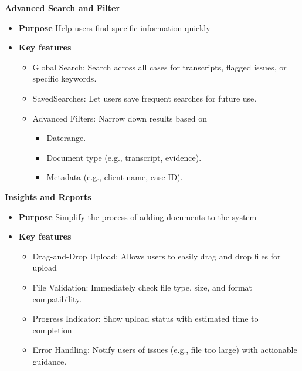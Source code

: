 \documentclass[12pt]{article}
\begin{document}
\textbf{   Advanced Search and Filter}
\begin{itemize}
  \item \textbf{Purpose}  Help users find specific information quickly
  \item \textbf{Key features}   
	\begin{itemize}
		\item  Global Search: Search across all cases for transcripts, flagged issues, or specific keywords.
		\item SavedSearches: Let users save frequent searches for future use.
		\item Advanced Filters: Narrow down results based on
		\begin{itemize}
			\item     Daterange.
			\item  Document type (e.g., transcript, evidence).
			\item Metadata (e.g., client name, case ID).
		\end{itemize}
	\end{itemize}
\end{itemize}

\textbf{  Insights and Reports}
\begin{itemize}
  \item \textbf{Purpose} Simplify the process of adding documents to the system
  \item \textbf{Key features}   
	\begin{itemize}
		\item   Drag-and-Drop Upload: Allows users to easily drag and drop files for upload
		\item  File Validation: Immediately check file type, size, and format compatibility.
		\item  Progress Indicator: Show upload status with estimated time to completion
		\item  Error Handling: Notify users of issues (e.g., file too large) with actionable guidance.
	\end{itemize}
\end{itemize}
\end{document}
